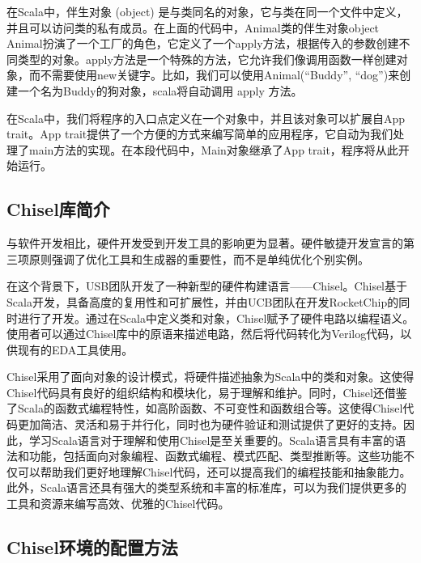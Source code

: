 在Scala中，伴生对象 (object) 是与类同名的对象，它与类在同一个文件中定义，并且可以访问类的私有成员。在上面的代码中，Animal类的伴生对象object Animal扮演了一个工厂的角色，它定义了一个apply方法，根据传入的参数创建不同类型的对象。apply方法是一个特殊的方法，它允许我们像调用函数一样创建对象，而不需要使用new关键字。比如，我们可以使用Animal(``Buddy'', ``dog'')来创建一个名为Buddy的狗对象，scala将自动调用 apply 方法。

在Scala中，我们将程序的入口点定义在一个对象中，并且该对象可以扩展自App trait。App trait提供了一个方便的方式来编写简单的应用程序，它自动为我们处理了main方法的实现。在本段代码中，Main对象继承了App trait，程序将从此开始运行。

\subsection{Chisel库简介}\label{sec:06-agility-008}

与软件开发相比，硬件开发受到开发工具的影响更为显著。硬件敏捷开发宣言的第三项原则强调了优化工具和生成器的重要性，而不是单纯优化个别实例。

在这个背景下，USB团队开发了一种新型的硬件构建语言------Chisel。Chisel基于Scala开发，具备高度的复用性和可扩展性，并由UCB团队在开发RocketChip的同时进行了开发。通过在Scala中定义类和对象，Chisel赋予了硬件电路以编程语义。使用者可以通过Chisel库中的原语来描述电路，然后将代码转化为Verilog代码，以供现有的EDA工具使用。

Chisel采用了面向对象的设计模式，将硬件描述抽象为Scala中的类和对象。这使得Chisel代码具有良好的组织结构和模块化，易于理解和维护。同时，Chisel还借鉴了Scala的函数式编程特性，如高阶函数、不可变性和函数组合等。这使得Chisel代码更加简洁、灵活和易于并行化，同时也为硬件验证和测试提供了更好的支持。因此，学习Scala语言对于理解和使用Chisel是至关重要的。Scala语言具有丰富的语法和功能，包括面向对象编程、函数式编程、模式匹配、类型推断等。这些功能不仅可以帮助我们更好地理解Chisel代码，还可以提高我们的编程技能和抽象能力。此外，Scala语言还具有强大的类型系统和丰富的标准库，可以为我们提供更多的工具和资源来编写高效、优雅的Chisel代码。

\subsection{Chisel环境的配置方法}\label{sec:06-agility-009}

